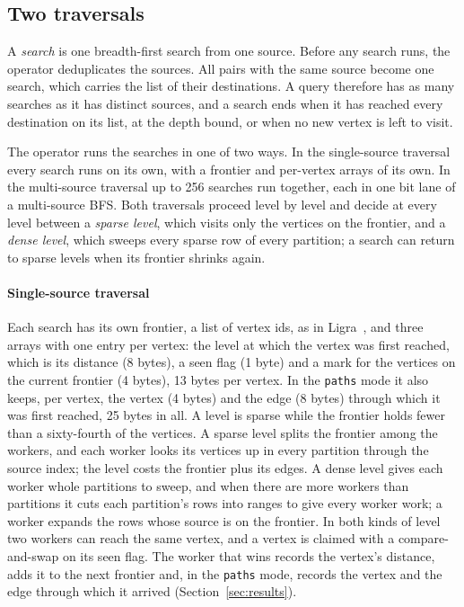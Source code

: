 \subsection{Two traversals}
\label{sec:traversals}

A \emph{search} is one breadth-first search from one source. Before any search runs, the operator deduplicates the
sources. All pairs with the same source become one search, which carries the list of their destinations. A query
therefore has as many searches as it has distinct sources, and a search ends when it has reached every destination
on its list, at the depth bound, or when no new vertex is left to visit.

The operator runs the searches in one of two ways. In the single-source traversal every search runs on its own, with a
frontier and per-vertex arrays of its own. In the multi-source traversal up to 256 searches run together, each in one
bit lane of a multi-source BFS. Both traversals proceed level by level and decide at every level between a
\emph{sparse level}, which visits only the vertices on the frontier, and a \emph{dense level}, which sweeps every
sparse row of every partition; a search can return to sparse levels when its frontier shrinks again.

\paragraph{Single-source traversal} Each search has its own frontier, a list of vertex ids, as in
Ligra~\cite{shun2013ligra}, and three arrays with one entry per vertex: the level at which the vertex was first
reached, which is its distance (8 bytes), a seen flag (1 byte) and a mark for the vertices on the current frontier
(4 bytes), 13 bytes per vertex. In the \texttt{paths} mode it also keeps, per vertex, the vertex (4 bytes) and the edge
(8 bytes) through which it was first reached, 25 bytes in all. A level is sparse while the frontier holds fewer than a
sixty-fourth of the vertices. A sparse level splits the frontier among the workers, and each worker looks its
vertices up in every partition through the source index; the level costs the frontier plus its edges. A dense level
gives each worker whole partitions to sweep, and when there are more workers than partitions it cuts each partition's
rows into ranges to give every worker work; a worker expands the rows whose source is on the frontier. In both
kinds of level two workers can reach the same vertex, and a vertex is claimed with a compare-and-swap on its seen
flag. The worker that wins records the vertex's distance, adds it to the next frontier and, in the \texttt{paths}
mode, records the vertex and the edge through which it arrived (Section~\ref{sec:results}).

